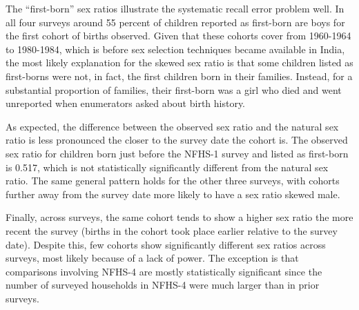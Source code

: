 \documentclass[12pt,letterpaper]{article}
\begin{document}
% 


The ``first-born'' sex ratios illustrate the systematic recall error problem well.
In all four surveys around 55 percent of children reported as first-born are boys
for the first cohort of births observed.
Given that these cohorts cover from 1960-1964 to 1980-1984, which is before sex selection 
techniques became available in India, the most likely explanation for the skewed sex ratio 
is that some children listed as first-borns were not, in fact, the first children born in 
their families.
Instead, for a substantial proportion of families, their first-born was a girl who died 
and went unreported when enumerators asked about birth history.

As expected, the difference between the observed sex ratio and the natural sex ratio is 
less pronounced the closer to the survey date the cohort is.
The observed sex ratio for children born just before the NFHS-1 survey and listed as 
first-born is 0.517, which is not statistically significantly different from the
natural sex ratio.
The same general pattern holds for the other three surveys, with cohorts further away
from the survey date more likely to have a sex ratio skewed male.


Finally, across surveys, the same cohort tends to show a higher sex ratio the more recent 
the survey (births in the cohort took place earlier relative to the survey date).
Despite this, few cohorts show significantly different sex ratios across surveys, most 
likely because of a lack of power.
The exception is that comparisons involving NFHS-4 are mostly statistically significant
since the number of surveyed households in NFHS-4 were much larger than in prior surveys.
\end{document}

